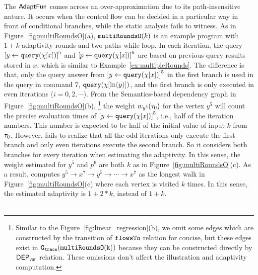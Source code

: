 \begin{example}
    \label{ex:multiRoundsO}
    The $\textsf{AdaptFun}$ comes across an over-approximation due to its path-insensitive nature. 
    It occurs when the control flow can be decided in a particular way in front of conditional branches,
    while the static analysis fails to witness. 
    As in Figure~\ref{fig:multiRoundsO}(a), $\mathtt{multiRoundsO}(k)$
    is an example program with $1 + k$ adaptivity rounds and two paths while loop.
    In each iteration, the query $\clabel{\assign{y}{\query(\chi[x])}}^{5}$
    and $\clabel{\assign{p}{\query(\chi[x])}}^{6}$ are based on previous query results stored in $x$,
    which is similar to Example~\ref{ex:multipleRounds}.
    The difference is that, only the query answer from $\clabel{\assign{y}{\query(\chi[x])}}^{5}$ in the first branch
    is used in the query in command $7$, ${\tt query}(\chi[\ln(y)])$,
    and the first branch is only executed in even iterations ($i = 0, 2, \cdots $).
    From the Semantics-based dependency graph in Figure~\ref{fig:multiRoundsO}(b),
    \footnote{Similar to the Figure~\ref{fig:linear_regression}(b), we omit some edges which are constructed by the transition of $\mathtt{flowsTo}$ relation
    for concise, but these edges exist
    in $\mathtt{{G_{trace}}}(\mathtt{multiRoundsO(k)})$ because they can be constructed directly by $\mathsf{DEP_{var}}$ relation.
    These omissions don't affect the illustration and adaptivity computation.} 
    the weight $w_{y^5}(\mathtt{\tau}_0)$ for the vertex $y^5$ will count the precise
    evaluation times of $\clabel{\assign{y}{\query(\chi[x])}}^{5}$, i.e., half of the iteration numbers.
    This number is expected to be half of the initial value of input $k$ from $\mathtt{\tau}_0$.
    However, {\THESYSTEM} fails to realize that all the odd iterations only execute the first branch
    and only even iterations execute the second branch. 
    So it considers both branches for every iteration when estimating the adaptivity. 
    In this sense, the weight estimated for $y^5$ and $p^6$ are both 
    $k$ as in Figure~\ref{fig:multiRoundsO}(c).
    As a result, {\THESYSTEM} computes $y^5 \to x^7 \to y^5 \to \cdots \to x^7 $
    as the longest walk in Figure~\ref{fig:multiRoundsO}(c)
    where each vertex is visited $k$ times.
    In this sense, the estimated adaptivity is $1 + 2 * k$, instead of $1 + k$. 
    { 
    \begin{figure}
    \centering
     \begin{subfigure}{1.0\textwidth}
    \centering
    {
     \[
     \begin{array}{l}

\end{array}\]}
\end{subfigure}
\end{figure}}
\end{example}
